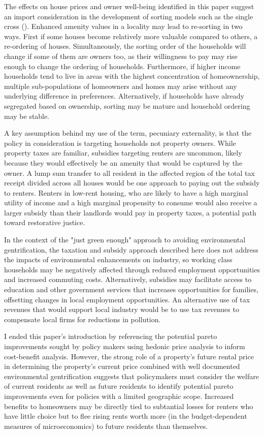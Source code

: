 \documentclass[ecta,nameyear,draft]{econsocart}
\theoremstyle{plain}
\theoremstyle{remark}
\begin{document}
The effects on house prices and owner well-being identified in this paper suggest an import consideration in the development of sorting models such as the single cross (\cite{banzhaf20}). Enhanced amenity values in a locality may lead to re-sorting in two ways. First if some houses become relatively more valuable compared to others, a re-ordering of houses. Simultaneously, the sorting order of the households will change if some of them are owners too, as their willingness to pay may rise enough to change the ordering of households. Furthermore, if higher income households tend to live in areas with the highest concentration of homeownership, multiple sub-populations of homeowners and homes may arise without any underlying difference in preferences. Alternatively, if households have already segregated based on ownership, sorting may be mature and household ordering may be stable.

A key assumption behind my use of the term, pecuniary externality, is that the policy in consideration is targeting households not property owners. While property taxes are familiar, subsidies targeting renters are uncommon, likely because they would effectively be an amenity that would be captured by the owner. A lump sum transfer to all resident in the affected region of the total tax receipt divided across all houses would be one approach to paying out the subsidy to renters. Renters in low-rent housing, who are likely to have a high marginal utility of income and a high marginal propensity to consume would also receive a larger subsidy than their landlords would pay in property taxes, a potential path toward restorative justice. 

In the context of the "just green enough" \cite{curran12} approach to avoiding environmental gentrification, the taxation and subsidy approach described here does not address the impacts of environmental enhancements on industry, so working class households may be negatively affected through reduced employment opportunities and increased commuting costs. Alternatively, subsidies may facilitate access to education and other government services that increases opportunities for families, offsetting changes in local employment opportunities. An alternative use of tax revenues that would support local industry would be to use tax revenues to compensate local firms for reductions in pollution.

I ended this paper's introduction by referencing the potential pareto improvements sought by policy makers using hedonic price analysis to inform cost-benefit analysis. However, the strong role of a property's future rental price in determining the property's current price combined with well documented environmental gentrification suggests that policymakers must consider the welfare of current residents as well as future residents to identify potential pareto improvements even for policies with a limited geographic scope. Increased benefits to homeowners may be directly tied to subtantial losses for renters who have little choice but to flee rising rents worth more (in the budget-dependent measures of microeconomics) to future residents than themselves.
\end{document}
